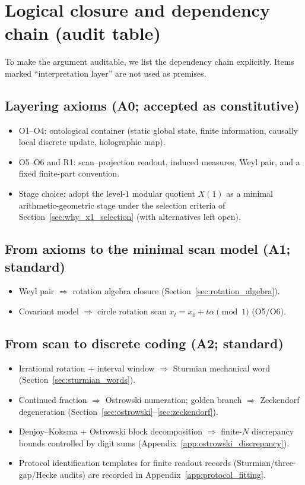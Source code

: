 \section{Logical closure and dependency chain (audit table)}
\label{app:audit_dependency_chain}

To make the argument auditable, we list the dependency chain explicitly. Items marked ``interpretation layer'' are not used as premises.

\subsection{Layering axioms (A0; accepted as constitutive)}
\label{app:a0}

\begin{itemize}
  \item O1--O4: ontological container (static global state, finite information, causally local discrete update, holographic map).
  \item O5--O6 and R1: scan--projection readout, induced measures, Weyl pair, and a fixed finite-part convention.
  \item Stage choice: adopt the level-$1$ modular quotient $X(1)$ as a minimal arithmetic-geometric stage under the selection criteria of Section~\ref{sec:why_x1_selection} (with alternatives left open).
\end{itemize}

\subsection{From axioms to the minimal scan model (A1; standard)}
\label{app:a1}

\begin{itemize}
  \item Weyl pair $\Rightarrow$ rotation algebra closure (Section~\ref{sec:rotation_algebra}).
  \item Covariant model $\Rightarrow$ circle rotation scan $x_t=x_0+t\alpha \pmod 1$ (O5/O6).
\end{itemize}

\subsection{From scan to discrete coding (A2; standard)}
\label{app:a2}

\begin{itemize}
  \item Irrational rotation + interval window $\Rightarrow$ Sturmian mechanical word (Section~\ref{sec:sturmian_words}).
  \item Continued fraction $\Rightarrow$ Ostrowski numeration; golden branch $\Rightarrow$ Zeckendorf degeneration (Section~\ref{sec:ostrowski}--\ref{sec:zeckendorf}).
  \item Denjoy--Koksma + Ostrowski block decomposition $\Rightarrow$ finite-$N$ discrepancy bounds controlled by digit sums (Appendix~\ref{app:ostrowski_discrepancy}).
  \item Protocol identification templates for finite readout records (Sturmian/three-gap/Hecke audits) are recorded in Appendix~\ref{app:protocol_fitting}.
\end{itemize}

